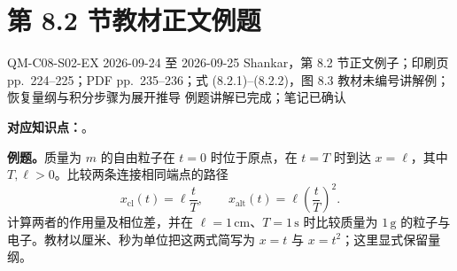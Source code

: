 \section{第 8.2 节教材正文例题}
\label{exercise-set:QM-C08-S02}
\exercisemeta
  {QM-C08-S02-EX}
  {2026-09-24 至 2026-09-25}
  {Shankar，第 8.2 节正文例子；印刷页 pp.~224--225；PDF pp.~235--236；式 (8.2.1)--(8.2.2)，图 8.3}
  {教材未编号讲解例；恢复量纲与积分步骤为展开推导}
  {例题讲解已完成；笔记已确认}

\textbf{对应知识点：}。

\textbf{例题。}质量为 $m$ 的自由粒子在 $t=0$ 时位于原点，在 $t=T$ 时到达 $x=\ell$，其中 $T,\ell>0$。比较两条连接相同端点的路径
\begin{equation}
  x_{\mathrm{cl}}(t)=\ell\frac{t}{T},\qquad
  x_{\mathrm{alt}}(t)=\ell\left(\frac{t}{T}\right)^2.
\end{equation}
计算两者的作用量及相位差，并在 $\ell=1\,\mathrm{cm}$、$T=1\,\mathrm{s}$ 时比较质量为 $1\,\mathrm g$ 的粒子与电子。教材以厘米、秒为单位把这两式简写为 $x=t$ 与 $x=t^2$；这里显式保留量纲。

